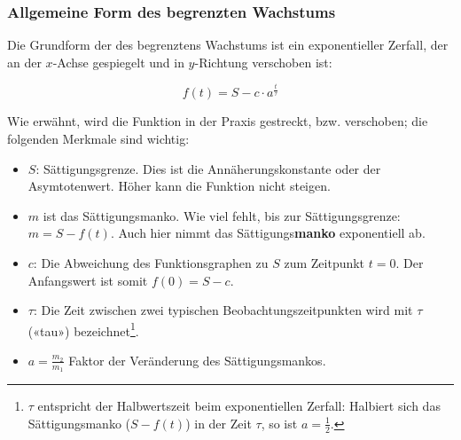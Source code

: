 \subsubsection{Allgemeine Form des begrenzten Wachstums}
\begin{center}
\end{center}

Die Grundform der des begrenztens Wachstums ist ein exponentieller Zerfall,
der an der $x$-Achse gespiegelt und in $y$-Richtung
verschoben ist:

$$f(t) =S - c\cdot{} a^{\frac{t}{\tau}}$$

Wie erwähnt, wird die Funktion in der Praxis gestreckt, bzw. verschoben; die folgenden Merkmale sind wichtig:

\begin{itemize}
	\item $S$: Sättigungsgrenze. Dies ist die Annäherungskonstante oder der Asymtotenwert. Höher kann die Funktion nicht steigen.

	\item $m$ ist das Sättigungsmanko. Wie viel fehlt, bis zur
    Sättigungsgrenze: $m = S - f(t)$. Auch hier nimmt das  Sättigungs\textbf{manko} exponentiell ab.
	\item $c$: Die Abweichung des Funktionsgraphen zu $S$ zum Zeitpunkt $t=0$. Der
    Anfangswert ist somit $f(0) = S - c$.
	\item $\tau$: Die Zeit zwischen zwei typischen Beobachtungszeitpunkten wird
    mit $\tau$ («tau») bezeichnet\footnote{$\tau$ entspricht der
      Halbwertszeit beim exponentiellen Zerfall: Halbiert sich das Sättigungsmanko ($S-f(t)$) in der Zeit $\tau$, so ist $a = \frac12$.}.
    \item $a=\frac{m_2}{m_1}$ Faktor der Veränderung des Sättigungsmankos.
\end{itemize}
\newpage


